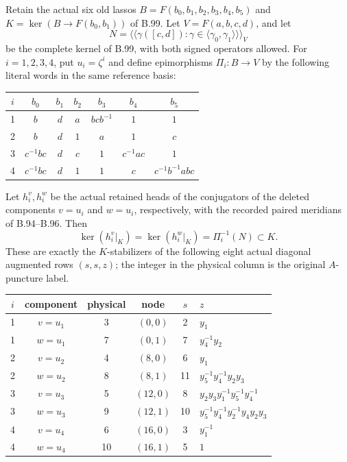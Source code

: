 \label{stmt:B101}
Retain the actual six old lassos
$B=F(b_0,b_1,b_2,b_3,b_4,b_5)$ and
$K=\ker(B\to F(b_0,b_1))$ of B.99.
Let $V=F(a,b,c,d)$, and let
\[
 N=\big\langle\!\big\langle
       \gamma([c,d]):\gamma\in\langle\gamma_0,\gamma_1\rangle
     \big\rangle\!\big\rangle_V
\]
be the complete kernel of B.99, with both signed operators allowed.
For $i=1,2,3,4$, put $u_i=\zeta^i$ and define epimorphisms
$\Pi_i:B\to V$ by the following literal words in the same reference basis:
\begin{center}
\small
\begin{tabular}{c@{\qquad}cccccc}
\toprule
$i$&$b_0$&$b_1$&$b_2$&$b_3$&$b_4$&$b_5$\\
\midrule
1&$b$&$d$&$a$&$bcb^{-1}$&$1$&$1$\\
2&$b$&$d$&$1$&$a$&$1$&$c$\\
3&$c^{-1}bc$&$d$&$c$&$1$&$c^{-1}ac$&$1$\\
4&$c^{-1}bc$&$d$&$1$&$1$&$c$&$c^{-1}b^{-1}abc$\\
\bottomrule
\end{tabular}
\end{center}
Let $h_i^v,h_i^w$ be the actual retained heads of the conjugators of
the deleted components $v=u_i$ and $w=u_i$, respectively, with the
recorded paired meridians of B.94--B.96.  Then
\begin{equation}\label{eq:B101-uniform-kernels}
 \ker(h_i^v|_K)=\ker(h_i^w|_K)=\Pi_i^{-1}(N)\subset K.
\end{equation}
These are exactly the $K$-stabilizers of the following eight actual
diagonal augmented rows $(s,s,z)$; the integer in the physical column
is the original $A$-puncture label.
\begin{center}
\small
\begin{tabular}{ccccc@{\quad}l}
\toprule
$i$&component&physical&node&$s$&$z$\\
\midrule
1&$v=u_1$&3&$(0,0)$&2&$y_1$\\
1&$w=u_1$&7&$(0,1)$&7&$y_4^{-1}y_2$\\
2&$v=u_2$&4&$(8,0)$&6&$y_1$\\
2&$w=u_2$&8&$(8,1)$&11&$y_5^{-1}y_4^{-1}y_2y_3$\\
3&$v=u_3$&5&$(12,0)$&8&$y_2y_3y_1^{-1}y_5^{-1}y_4^{-1}$\\
3&$w=u_3$&9&$(12,1)$&10&$y_5^{-1}y_4^{-1}y_2^{-1}y_4y_2y_3$\\
4&$v=u_4$&6&$(16,0)$&3&$y_1^{-1}$\\
4&$w=u_4$&10&$(16,1)$&5&$1$\\
\bottomrule
\end{tabular}
\end{center}
